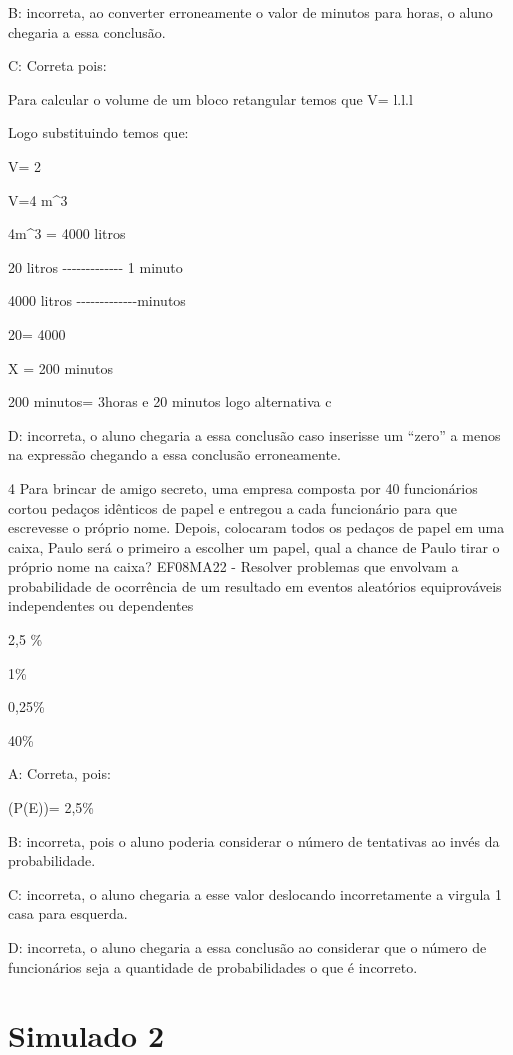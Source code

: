 B: incorreta, ao converter erroneamente o valor de minutos para horas, o
aluno chegaria a essa conclusão.

C: Correta pois:

Para calcular o volume de um bloco retangular temos que V= l.l.l

Logo substituindo temos que:

V= 2

V=4 m^3

4m^3 = 4000 litros

20 litros -\/-\/-\/-\/-\/-\/-\/-\/-\/-\/-\/-\/- 1 minuto

4000 litros -\/-\/-\/-\/-\/-\/-\/-\/-\/-\/-\/-\/-\times minutos

20\times \times = 4000

X = 200 minutos

200 minutos= 3horas e 20 minutos logo alternativa c

D: incorreta, o aluno chegaria a essa conclusão caso inserisse um
``zero'' a menos na expressão chegando a essa conclusão erroneamente.

\num{4} Para brincar de amigo secreto, uma empresa composta por 40
funcionários cortou pedaços idênticos de papel e entregou a cada
funcionário para que escrevesse o próprio nome. Depois, colocaram todos
os pedaços de papel em uma caixa, Paulo será o primeiro a escolher um
papel, qual a chance de Paulo tirar o próprio nome na caixa? EF08MA22 -
Resolver problemas que envolvam a probabilidade de ocorrência de um
resultado em eventos aleatórios equiprováveis independentes ou
dependentes

\item 2,5 \%
\item 1\%
\item 0,25\%
\item 40\%

A: Correta, pois:

(P(E))= 2,5\%

B: incorreta, pois o aluno poderia considerar o número de tentativas ao
invés da probabilidade.

C: incorreta, o aluno chegaria a esse valor deslocando incorretamente a
virgula 1 casa para esquerda.

D: incorreta, o aluno chegaria a essa conclusão ao considerar que o
número de funcionários seja a quantidade de probabilidades o que é
incorreto.

\section{Simulado 2}

